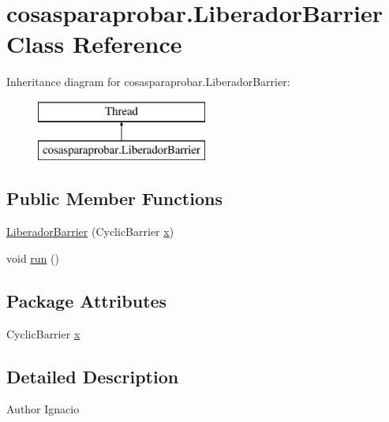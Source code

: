 \hypertarget{classcosasparaprobar_1_1_liberador_barrier}{}\section{cosasparaprobar.\+Liberador\+Barrier Class Reference}
\label{classcosasparaprobar_1_1_liberador_barrier}
Inheritance diagram for cosasparaprobar.\+Liberador\+Barrier\+:\begin{figure}[H]
\begin{center}
\leavevmode
\includegraphics[height=2.000000cm]{classcosasparaprobar_1_1_liberador_barrier}
\end{center}
\end{figure}
\subsection*{Public Member Functions}
\begin{DoxyCompactItemize}
\item 
\mbox{\hyperlink{classcosasparaprobar_1_1_liberador_barrier_a1dc02539d347dd8def3f305ce1740ec0}{Liberador\+Barrier}} (Cyclic\+Barrier \mbox{\hyperlink{classcosasparaprobar_1_1_liberador_barrier_aa6e62e53154e857e0aa8023d87cc42c4}{x}})
\item 
void \mbox{\hyperlink{classcosasparaprobar_1_1_liberador_barrier_a2942f49c87a66261795bfe3ca4bc48db}{run}} ()
\end{DoxyCompactItemize}
\subsection*{Package Attributes}
\begin{DoxyCompactItemize}
\item 
Cyclic\+Barrier \mbox{\hyperlink{classcosasparaprobar_1_1_liberador_barrier_aa6e62e53154e857e0aa8023d87cc42c4}{x}}
\end{DoxyCompactItemize}


\subsection{Detailed Description}
\begin{DoxyAuthor}{Author}
Ignacio 
\end{DoxyAuthor}


